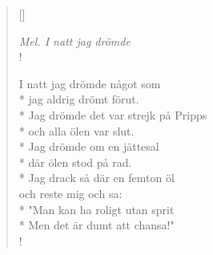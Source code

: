 
\settowidth{\versewidth}{I natt jag drömde något som}



\begin{verse}[\versewidth]

\flagverse{}
\emph{Mel. I natt jag drömde}\\!

\flagverse{}
I natt jag drömde något som\\*
jag aldrig drömt förut.\\*
Jag drömde det var strejk på Pripps\\*
och alla ölen var slut.\\*
Jag drömde om en jättesal\\*
där ölen stod på rad.\\*
Jag drack så där en femton öl\\
och reste mig och sa:\\*
"Man kan ha roligt utan sprit\\*
Men det är dumt att chansa!"\\! 


\end{verse}

